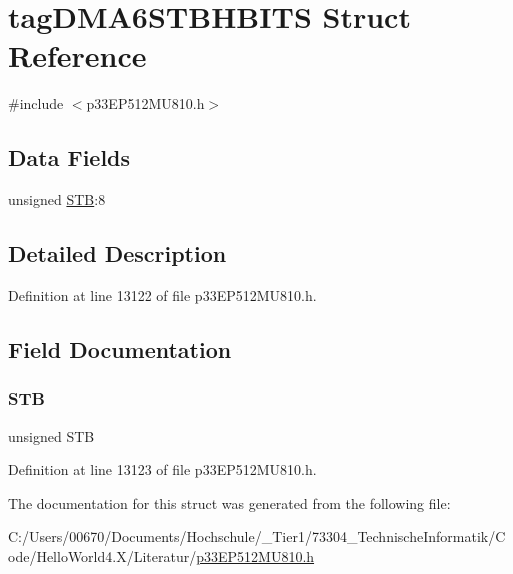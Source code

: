 \hypertarget{structtag_d_m_a6_s_t_b_h_b_i_t_s}{}\section{tag\+D\+M\+A6\+S\+T\+B\+H\+B\+I\+TS Struct Reference}
\label{structtag_d_m_a6_s_t_b_h_b_i_t_s}


{\ttfamily \#include $<$p33\+E\+P512\+M\+U810.\+h$>$}

\subsection*{Data Fields}
\begin{DoxyCompactItemize}
\item 
unsigned \hyperlink{structtag_d_m_a6_s_t_b_h_b_i_t_s_a9bd043a4db27e09b5035a563a8758fe7}{S\+TB}\+:8
\end{DoxyCompactItemize}


\subsection{Detailed Description}


Definition at line 13122 of file p33\+E\+P512\+M\+U810.\+h.



\subsection{Field Documentation}
\mbox{\label{structtag_d_m_a6_s_t_b_h_b_i_t_s_a9bd043a4db27e09b5035a563a8758fe7}} 
\subsubsection{\texorpdfstring{S\+TB}{STB}}
{\footnotesize\ttfamily unsigned S\+TB}



Definition at line 13123 of file p33\+E\+P512\+M\+U810.\+h.



The documentation for this struct was generated from the following file\+:\begin{DoxyCompactItemize}
\item 
C\+:/\+Users/00670/\+Documents/\+Hochschule/\+\_\+\+Tier1/73304\+\_\+\+Technische\+Informatik/\+Code/\+Hello\+World4.\+X/\+Literatur/\hyperlink{p33_e_p512_m_u810_8h}{p33\+E\+P512\+M\+U810.\+h}\end{DoxyCompactItemize}
